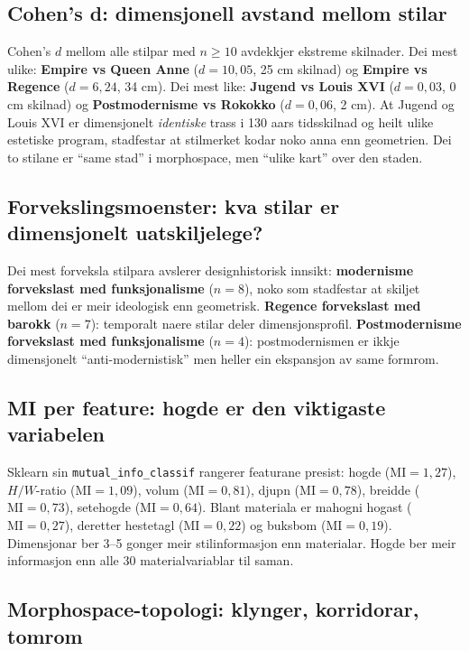 \documentclass[10pt, a4paper, twocolumn]{article}
\begin{document}
\subsection{Cohen's d: dimensjonell avstand mellom stilar}

Cohen's $d$ mellom alle stilpar med $n \geq 10$ avdekkjer ekstreme skilnader. Dei mest ulike: \textbf{Empire vs Queen Anne} ($d = 10{,}05$, 25 cm skilnad) og \textbf{Empire vs Regence} ($d = 6{,}24$, 34 cm). Dei mest like: \textbf{Jugend vs Louis XVI} ($d = 0{,}03$, 0 cm skilnad) og \textbf{Postmodernisme vs Rokokko} ($d = 0{,}06$, 2 cm). At Jugend og Louis XVI er dimensjonelt \emph{identiske} trass i 130 aars tidsskilnad og heilt ulike estetiske program, stadfestar at stilmerket kodar noko anna enn geometrien. Dei to stilane er ``same stad'' i morphospace, men ``ulike kart'' over den staden.

\subsection{Forvekslingsmoenster: kva stilar er dimensjonelt uatskiljelege?}

Dei mest forveksla stilpara avslerer designhistorisk innsikt: \textbf{modernisme forvekslast med funksjonalisme} ($n = 8$), noko som stadfestar at skiljet mellom dei er meir ideologisk enn geometrisk. \textbf{Regence forvekslast med barokk} ($n = 7$): temporalt naere stilar deler dimensjonsprofil. \textbf{Postmodernisme forvekslast med funksjonalisme} ($n = 4$): postmodernismen er ikkje dimensjonelt ``anti-modernistisk'' men heller ein ekspansjon av same formrom.

\subsection{MI per feature: hogde er den viktigaste variabelen}

Sklearn sin \texttt{mutual\_info\_classif} rangerer featurane presist: hogde ($\text{MI} = 1{,}27$), $H/W$-ratio ($\text{MI} = 1{,}09$), volum ($\text{MI} = 0{,}81$), djupn ($\text{MI} = 0{,}78$), breidde ($\text{MI} = 0{,}73$), setehogde ($\text{MI} = 0{,}64$). Blant materiala er mahogni hogast ($\text{MI} = 0{,}27$), deretter hestetagl ($\text{MI} = 0{,}22$) og buksbom ($\text{MI} = 0{,}19$). Dimensjonar ber 3--5 gonger meir stilinformasjon enn materialar. Hogde ber meir informasjon enn alle 30 materialvariablar til saman.

\subsection{Morphospace-topologi: klynger, korridorar, tomrom}
\end{document}
